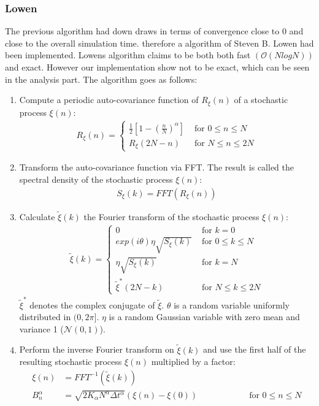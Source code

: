 \documentclass[
  a4paper,BCOR10mm,oneside,
  headsepline,footsepline,%
  fleqn,openbib
]{scrbook}
\begin{document}
\subsubsection{Lowen}
The previous algorithm had down draws in terms of convergence close to 0 and close to the overall simulation time. therefore a algorithm of Steven B. Lowen \cite{Lowen1999} had been implemented. Lowens algorithm claims to be both both fast $(\mathcal{O}(NlogN))$ and exact. However our implementation show not to be exact, which can be seen in the analysis part. The algorithm goes as follows:
\begin{enumerate}
 \item Compute a periodic auto-covariance function of $R_{\xi}(n)$ of a stochastic process $\xi(n)$:
 \begin{align}
  R_{\xi}(n)=
  \begin{cases}
   \frac{1}{2}\left[1-\left(\frac{n}{N}\right)^{\alpha} \right]  & \text{ for    } 0 \leq n \leq N \\
   R_{\xi}(2N-n)  & \text{ for    } N \leq n \leq 2N 
  \end{cases}
 \end{align}
 \item Transform the auto-covariance function via FFT. The result is called the spectral density of the stochastic process $\xi(n)$:
  \begin{align}
   S_{\xi}(k)= FFT(R_{\xi}(n))
  \end{align}
 \item Calculate $\tilde\xi(k)$ the Fourier transform of the stochastic process $\xi(n)$:
 \begin{align}
  \tilde\xi(k)=
  \begin{cases}
     0  & \text{ for    } k=0 \\    
     exp(i \theta) \eta \sqrt{S_{\xi}(k)}  & \text{ for    } 0 \leq k \leq N \\
     \eta \sqrt{S_{\xi}(k)}  & \text{ for    } k = N \\
     \tilde\xi^{*}(2N-k) & \text{ for    } N \leq k \leq 2N 
  \end{cases}
 \end{align}
 $\tilde\xi^{*}$ denotes the complex conjugate of $\tilde\xi$. $\theta$ is a random variable uniformly distributed  in $(0,2\pi]$. $\eta$ is a random Gaussian variable with zero mean and variance 1 ($\mathcal{N}(0,1)$).  
 \item Perform the inverse Fourier transform on $\tilde\xi(k)$ and use the first half of the resulting stochastic process $\xi(n)$ multiplied by a factor:
 \begin{align}
  \xi(n)&=FFT^{-1}(\tilde\xi(k)) \\
  B^{\alpha}_n&=  \sqrt{2 K_{\alpha} N^{\alpha} \Delta t^{\alpha}} (\xi(n)- \xi(0)) \qquad \qquad \qquad \text{for    } 0 \leq n \leq N
 \end{align}
\end{enumerate}
\end{document}
